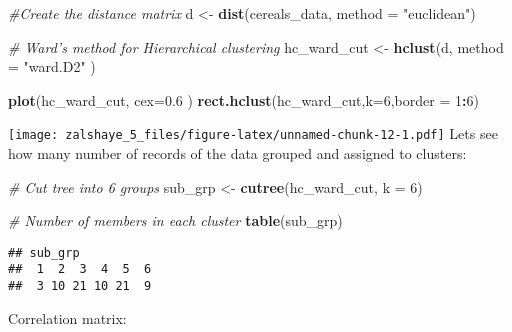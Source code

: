 \documentclass[
]{article}
\newenvironment{Shaded}{\begin{snugshade}}{\end{snugshade}}
\newcommand{\CommentTok}[1]{\textcolor[rgb]{0.56,0.35,0.01}{\textit{#1}}}
\newcommand{\DataTypeTok}[1]{\textcolor[rgb]{0.13,0.29,0.53}{#1}}
\newcommand{\DecValTok}[1]{\textcolor[rgb]{0.00,0.00,0.81}{#1}}
\newcommand{\FloatTok}[1]{\textcolor[rgb]{0.00,0.00,0.81}{#1}}
\newcommand{\KeywordTok}[1]{\textcolor[rgb]{0.13,0.29,0.53}{\textbf{#1}}}
\newcommand{\NormalTok}[1]{#1}
\newcommand{\OperatorTok}[1]{\textcolor[rgb]{0.81,0.36,0.00}{\textbf{#1}}}
\newcommand{\OtherTok}[1]{\textcolor[rgb]{0.56,0.35,0.01}{#1}}
\newcommand{\StringTok}[1]{\textcolor[rgb]{0.31,0.60,0.02}{#1}}
\begin{document}
\begin{Shaded}
\begin{Highlighting}[]
\CommentTok{#Create the distance matrix}
\NormalTok{d <-}\StringTok{ }\KeywordTok{dist}\NormalTok{(cereals_data, }\DataTypeTok{method =} \StringTok{"euclidean"}\NormalTok{)}

\CommentTok{# Ward's method for Hierarchical clustering}
\NormalTok{hc_ward_cut <-}\StringTok{ }\KeywordTok{hclust}\NormalTok{(d, }\DataTypeTok{method =} \StringTok{"ward.D2"}\NormalTok{ )}

\KeywordTok{plot}\NormalTok{(hc_ward_cut, }\DataTypeTok{cex=}\FloatTok{0.6}\NormalTok{ )}
\KeywordTok{rect.hclust}\NormalTok{(hc_ward_cut,}\DataTypeTok{k=}\DecValTok{6}\NormalTok{,}\DataTypeTok{border =} \DecValTok{1}\OperatorTok{:}\DecValTok{6}\NormalTok{)}
\end{Highlighting}
\end{Shaded}

\texttt{[image: zalshaye\_5\_files/figure-latex/unnamed-chunk-12-1.pdf]}
Lets see how many number of records of the data grouped and assigned to
clusters:

\begin{Shaded}
\begin{Highlighting}[]
\CommentTok{# Cut tree into 6 groups}
\NormalTok{sub_grp <-}\StringTok{ }\KeywordTok{cutree}\NormalTok{(hc_ward_cut, }\DataTypeTok{k =} \DecValTok{6}\NormalTok{)}

\CommentTok{# Number of members in each cluster}
\KeywordTok{table}\NormalTok{(sub_grp)}
\end{Highlighting}
\end{Shaded}

\begin{verbatim}
## sub_grp
##  1  2  3  4  5  6 
##  3 10 21 10 21  9
\end{verbatim}

Correlation matrix:

\begin{Shaded}
\end{Shaded}
\end{document}
